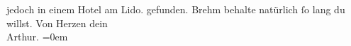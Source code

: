 \begin{ledgroupsized}[t]{13cm}
{{{                  jedoch in einem Hotel am Lido.}}}\label{K_L01677_1h} gefunden.
                  Brehm behalte natürlich ſo lang du willst.\pend
           \pstart
           Von Herzen dein{\\[\baselineskip]}\spacefill\mbox{Arthur.}\pend
           \leftskip=0em{}
         
         \endnumbering{}\end{ledgroupsized}  \newcommand{\dateiname}{L01677}\newcommand{\titel}{Arthur Schnitzler an Hermann Bahr, 20. 5. 1907}\newcommand{\editorInnen}{ Kurt Ifkovits,  Martin Anton Müller}
      